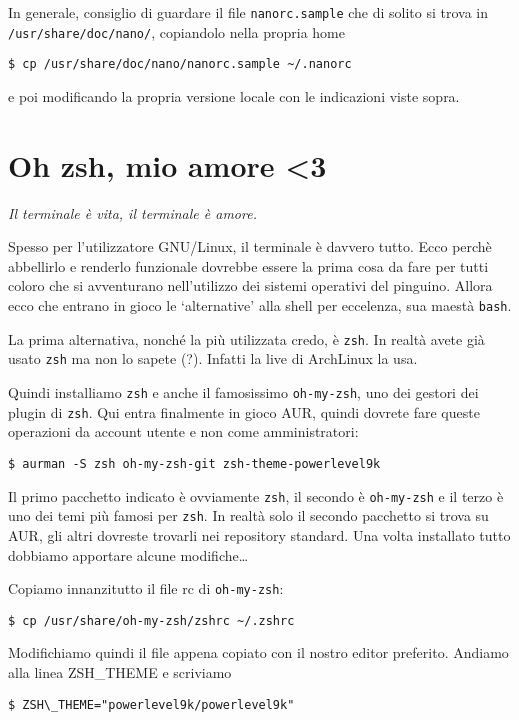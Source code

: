 \documentclass[twoside,italian]{book}
\newcommand{\code}[1]{\texttt{#1}}
\newcommand{\arch}{ArchLinux}
\begin{document}
    In generale, consiglio di guardare il file \code{nanorc.sample} che di solito si trova in \code{/usr/share/doc/nano/}, copiandolo nella propria home
    \begin{lstlisting}
$ cp /usr/share/doc/nano/nanorc.sample ~/.nanorc
    \end{lstlisting}
    e poi modificando la propria versione locale con le indicazioni viste sopra.
    
\section{Oh zsh, mio amore <3}
    \begin{flushright}
    \emph{Il terminale è vita, il terminale è amore.} 
    \end{flushright}
    
    Spesso per l'utilizzatore GNU/Linux, il terminale è davvero tutto. Ecco perchè abbellirlo e renderlo funzionale dovrebbe essere la prima cosa da fare per tutti coloro che si avventurano nell'utilizzo dei sistemi operativi del pinguino. Allora ecco che entrano in gioco le `alternative' alla shell per eccelenza, sua maestà \code{bash}.
    
    La prima alternativa, nonché la più utilizzata credo, è \code{zsh}. In realtà avete già usato \code{zsh} ma non lo sapete (?). Infatti la live di \arch{} la usa.
    
    Quindi installiamo \code{zsh} e anche il famosissimo \code{oh-my-zsh}, uno dei gestori dei plugin di \code{zsh}.
    Qui entra finalmente in gioco \ac{AUR}, quindi dovrete fare queste operazioni da account utente e non come amministratori:
    \begin{lstlisting}
$ aurman -S zsh oh-my-zsh-git zsh-theme-powerlevel9k
    \end{lstlisting}
     
    Il primo pacchetto indicato è ovviamente \code{zsh}, il secondo è \code{oh-my-zsh} e il terzo è uno dei temi più famosi per \code{zsh}. In realtà solo il secondo pacchetto si trova su \ac{AUR}, gli altri dovreste trovarli nei repository standard.
    Una volta installato tutto dobbiamo apportare alcune modifiche\dots

    Copiamo innanzitutto il file rc di \code{oh-my-zsh}:
    \begin{lstlisting}
$ cp /usr/share/oh-my-zsh/zshrc ~/.zshrc
    \end{lstlisting}
    Modifichiamo quindi il file appena copiato con il nostro editor preferito. Andiamo alla linea ZSH\_THEME e scriviamo 
    \begin{lstlisting}
$ ZSH\_THEME="powerlevel9k/powerlevel9k"
    \end{lstlisting}
    
\end{document}
